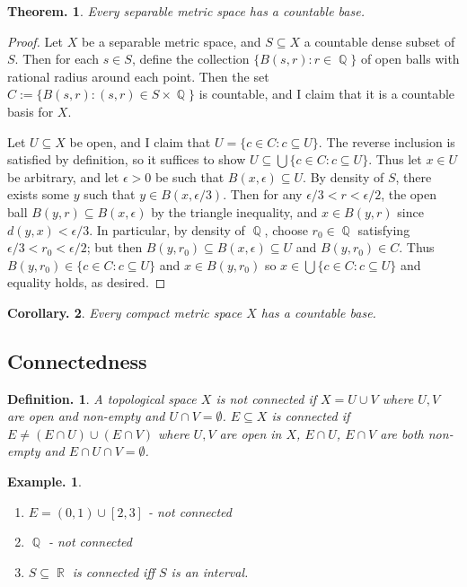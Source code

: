 \documentclass[11pt, a4paper]{memoir}
\DeclareMathOperator{\Q}{{\mathbb{Q}}}
\DeclareMathOperator{\R}{{\mathbb{R}}}
\theoremstyle{change}
\newtheorem{theorem}{Theorem.}[section]
\newtheorem{corollary}[theorem]{Corollary.}
\theoremstyle{plain}
\theoremstyle{nonumberplain}
\newtheorem{definition}{Definition.}
\newtheorem{example}{Example.}
\newtheorem{proof}{Proof}
\numberwithin{equation}{section}
\begin{document}
\begin{theorem}
    Every separable metric space has a countable base.
\end{theorem}
\begin{proof}
    Let $X$ be a separable metric space, and $S\subseteq X$ a countable dense subset of $S$. Then for each
    $s\in S$, define the collection $\{B(s,r):r\in\Q\}$ of open balls with rational radius around each point.
    Then the set $C:=\{B(s,r):(s,r)\in S\times\Q\}$ is countable, and I claim that it is a countable basis for
    $X$.

    Let $U\subseteq X$ be open, and I claim that $U=\{c\in C:c\subseteq U\}$. The reverse inclusion is satisfied
    by definition, so it suffices to show $U\subseteq \bigcup\{c\in C:c\subseteq U\}$. Thus let $x\in U$ be arbitrary,
    and let $\epsilon>0$ be such that $B(x,\epsilon)\subseteq U$. By density of $S$, there exists some $y$ such that
    $y\in B(x,\epsilon/3)$. Then for any $\epsilon/3<r<\epsilon/2$, the open ball $B(y,r)\subseteq B(x,\epsilon)$
    by the triangle inequality, and $x\in B(y,r)$ since $d(y,x)<\epsilon/3$. In particular, by density
    of $\Q$, choose $r_0\in\Q$ satisfying $\epsilon/3<r_0<\epsilon/2$; but then $B(y,r_0)\subseteq B(x,\epsilon)\subseteq U$
    and $B(y,r_0)\in C$. Thus $B(y,r_0)\in\{c\in C:c\subseteq U\}$ and $x\in B(y,r_0)$ so $x\in\bigcup\{c\in C:c\subseteq U\}$
    and equality holds, as desired.
\end{proof}
\begin{corollary}
    Every compact metric space $X$ has a countable base.
\end{corollary}
\subsection{Connectedness}
\begin{definition}
    A topological space $X$ is \textit{not connected} if $X=U\cup V$ where $U,V$ are open and non-empty and $U\cap V=\emptyset$.
    $E\subseteq X$ is connected if $E\neq (E\cap U)\cup (E\cap V)$ where $U,V$ are open in $X$, $E\cap U$, $E\cap V$ are both
    non-empty and $E\cap U\cap V=\emptyset$.
\end{definition}
\begin{example}
    \begin{enumerate}
        \item $E=(0,1)\cup[2,3]$ - not connected
        \item $\Q$ - not connected
        \item $S\subseteq\R$ is connected iff $S$ is an interval.
    \end{enumerate}
\end{example}
\end{document}
